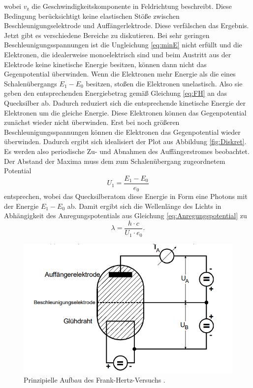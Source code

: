 wobei $v_\text{z}$ die Geschwindigkeitskomponente in Feldrichtung beschreibt. Diese Bedingung
berücksichtigt keine elastischen Stöße zwischen Beschleunigungselektrode und Auffängerlektrode. Diese verfälschen 
das Ergebnis.\\
Jetzt gibt es verschiedene Bereiche zu diskutieren. Bei sehr geringen Beschleunigungsspannungen
ist die Ungleichung \eqref{eq:minE} nicht erfüllt und die Elektronen, die idealerweise monoelektrisch sind und beim Austritt aus der 
Elektrode keine kinetische Energie besitzen, können dann nicht das Gegenpotential überwinden.
Wenn die Elektronen mehr Energie als die eines Schalenübergangs $E_1-E_0$ besitzen, stoßen 
die Elektronen unelastisch. Also sie geben den entsprechenden Energiebetrag gemäß 
Gleichung \eqref{eq:FH} an das Quecksilber ab. Dadurch reduziert sich die entsprechende kinetische Energie 
der Elektronen um die gleiche Energie. Diese Elektronen können das Gegenpotential zunächst wieder nicht 
überwinden. Erst bei noch größeren Beschleunigungsspannungen können die Elektronen das Gegenpotential wieder überwinden.
Dadurch ergibt sich idealisiert der Plot aus Abbildung \ref{fig:Diskret}. Es werden also periodische Zu- und Abnahmen 
des Auffängerstromes beobachtet. Der Abstand der Maxima muss dem zum Schalenübergang zugeordnetem
Potential
\begin{equation}
    U_1=\frac{E_1-E_0}{e_0}
    \label{eq:Anregungspotential}
\end{equation}
entsprechen, wobei das Quecksilberatom diese Energie in Form eine Photons mit der Energie $E_1-E_0$ ab.
Damit ergibt sich die Wellenlänge des Lichts in Abhängigkeit des Anregungspotentials aus Gleichung \eqref{eq:Anregungspotential} zu 
\begin{equation}
    \lambda =\frac{h\cdot c}{U_1\cdot e_0}.
    \label{eq:WellenL}
\end{equation}
\begin{figure}[H]
    \centering
    \includegraphics[scale=1]{content/PAufbau.png}
    \caption{Prinzipielle Aufbau des Frank-Hertz-Versuchs \cite{sample}.}
    \label{fig:FH}
\end{figure}

